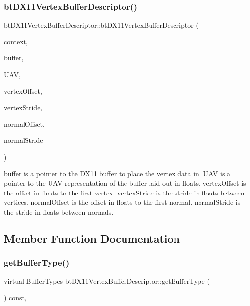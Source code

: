 \subsubsection{\texorpdfstring{bt\+D\+X11\+Vertex\+Buffer\+Descriptor()}{btDX11VertexBufferDescriptor()}\hspace{0.1cm}{\footnotesize\ttfamily [4/4]}}
{\footnotesize\ttfamily bt\+D\+X11\+Vertex\+Buffer\+Descriptor\+::bt\+D\+X11\+Vertex\+Buffer\+Descriptor (\begin{DoxyParamCaption}\item[{I\+D3\+D11\+Device\+Context $\ast$}]{context,  }\item[{I\+D3\+D11\+Buffer $\ast$}]{buffer,  }\item[{I\+D3\+D11\+Unordered\+Access\+View $\ast$}]{U\+AV,  }\item[{int}]{vertex\+Offset,  }\item[{int}]{vertex\+Stride,  }\item[{int}]{normal\+Offset,  }\item[{int}]{normal\+Stride }\end{DoxyParamCaption})\hspace{0.3cm}{\ttfamily [inline]}}

buffer is a pointer to the D\+X11 buffer to place the vertex data in. U\+AV is a pointer to the U\+AV representation of the buffer laid out in floats. vertex\+Offset is the offset in floats to the first vertex. vertex\+Stride is the stride in floats between vertices. normal\+Offset is the offset in floats to the first normal. normal\+Stride is the stride in floats between normals. 

\subsection{Member Function Documentation}
\mbox{\label{classbtDX11VertexBufferDescriptor_aaa92499e7319fda25f7cd787b14c4933}} 
\subsubsection{\texorpdfstring{get\+Buffer\+Type()}{getBufferType()}\hspace{0.1cm}{\footnotesize\ttfamily [1/2]}}
{\footnotesize\ttfamily virtual Buffer\+Types bt\+D\+X11\+Vertex\+Buffer\+Descriptor\+::get\+Buffer\+Type (\begin{DoxyParamCaption}{ }\end{DoxyParamCaption}) const\hspace{0.3cm}{\ttfamily [inline]}, {\ttfamily [virtual]}}

